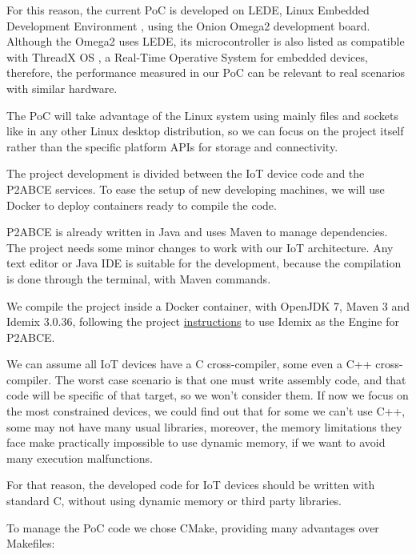 For this reason, the current \ac{PoC} is developed on LEDE, Linux Embedded Development Environment \citep{ledeproject}, using the Onion Omega2 development board. Although the Omega2 uses LEDE, its microcontroller is also listed as compatible with ThreadX OS \citep{THREADX}, a Real-Time Operative System for embedded devices, therefore, the performance measured in our PoC can be relevant to real scenarios with similar hardware.

The PoC will take advantage of the Linux system using mainly files and sockets like in any other Linux desktop distribution, so we can focus on the project itself rather than the specific platform APIs for storage and connectivity.


\hfil

The project development is divided between the IoT device code and the P2ABCE services. To ease the setup of new developing machines, we will use Docker to deploy containers ready to compile the code.

\hfil

P2ABCE is already written in Java and uses Maven to manage dependencies. The project needs some minor changes to work with our IoT architecture. Any text editor or Java IDE is suitable for the development, because the compilation is done through the terminal, with Maven commands.

We compile the project inside a Docker container, with OpenJDK 7, Maven 3 and Idemix 3.0.36, following the project \href{https://github.com/p2abcengine/p2abcengine/wiki/How-to-Build-the-ABC-Engine}{instructions} to use Idemix as the Engine for P2ABCE.

\hfil

We can assume all IoT devices have a C cross-compiler, some even a C++ cross-compiler. The worst case scenario is that one must write assembly code, and that code will be specific of that target, so we won't consider them.
If now we focus on the most constrained devices, we could find out that for some we can't use C++, some may not have many usual libraries, moreover, the memory limitations they face make practically impossible to use dynamic memory, if we want to avoid many execution malfunctions.

For that reason, the developed code for IoT devices should be written with standard C, without using dynamic memory or third party libraries.

\hfil


To manage the PoC code we chose CMake, providing many advantages over Makefiles:

